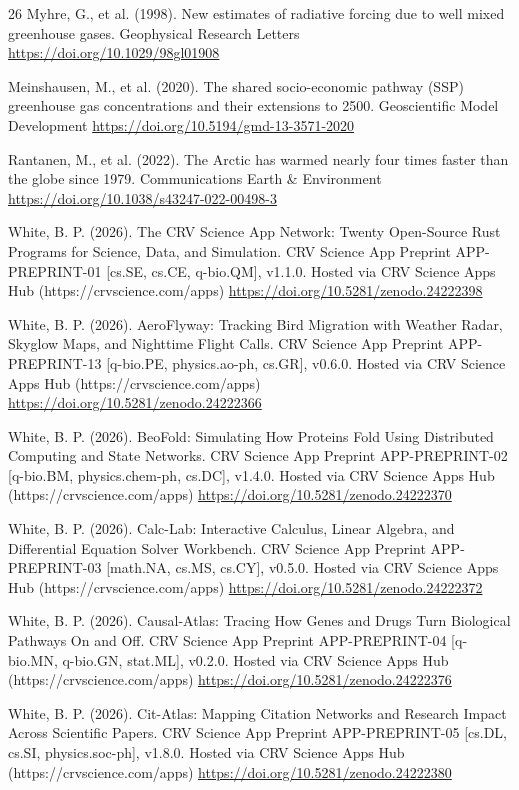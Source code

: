 \documentclass[10pt,letterpaper]{article}
\begin{document}
\begin{thebibliography}{26}
 Myhre, G., et al. (1998). New estimates of radiative forcing due to well mixed greenhouse gases. Geophysical Research Letters \url{https://doi.org/10.1029/98gl01908}

 Meinshausen, M., et al. (2020). The shared socio-economic pathway (SSP) greenhouse gas concentrations and their extensions to 2500. Geoscientific Model Development \url{https://doi.org/10.5194/gmd-13-3571-2020}

 Rantanen, M., et al. (2022). The Arctic has warmed nearly four times faster than the globe since 1979. Communications Earth \& Environment \url{https://doi.org/10.1038/s43247-022-00498-3}

 White, B. P. (2026). The CRV Science App Network: Twenty Open-Source Rust Programs for Science, Data, and Simulation. CRV Science App Preprint APP-PREPRINT-01 [cs.SE, cs.CE, q-bio.QM], v1.1.0. Hosted via CRV Science Apps Hub (https://crvscience.com/apps) \url{https://doi.org/10.5281/zenodo.24222398}

 White, B. P. (2026). AeroFlyway: Tracking Bird Migration with Weather Radar, Skyglow Maps, and Nighttime Flight Calls. CRV Science App Preprint APP-PREPRINT-13 [q-bio.PE, physics.ao-ph, cs.GR], v0.6.0. Hosted via CRV Science Apps Hub (https://crvscience.com/apps) \url{https://doi.org/10.5281/zenodo.24222366}

 White, B. P. (2026). BeoFold: Simulating How Proteins Fold Using Distributed Computing and State Networks. CRV Science App Preprint APP-PREPRINT-02 [q-bio.BM, physics.chem-ph, cs.DC], v1.4.0. Hosted via CRV Science Apps Hub (https://crvscience.com/apps) \url{https://doi.org/10.5281/zenodo.24222370}

 White, B. P. (2026). Calc-Lab: Interactive Calculus, Linear Algebra, and Differential Equation Solver Workbench. CRV Science App Preprint APP-PREPRINT-03 [math.NA, cs.MS, cs.CY], v0.5.0. Hosted via CRV Science Apps Hub (https://crvscience.com/apps) \url{https://doi.org/10.5281/zenodo.24222372}

 White, B. P. (2026). Causal-Atlas: Tracing How Genes and Drugs Turn Biological Pathways On and Off. CRV Science App Preprint APP-PREPRINT-04 [q-bio.MN, q-bio.GN, stat.ML], v0.2.0. Hosted via CRV Science Apps Hub (https://crvscience.com/apps) \url{https://doi.org/10.5281/zenodo.24222376}

 White, B. P. (2026). Cit-Atlas: Mapping Citation Networks and Research Impact Across Scientific Papers. CRV Science App Preprint APP-PREPRINT-05 [cs.DL, cs.SI, physics.soc-ph], v1.8.0. Hosted via CRV Science Apps Hub (https://crvscience.com/apps) \url{https://doi.org/10.5281/zenodo.24222380}


\end{thebibliography}
\end{document}
